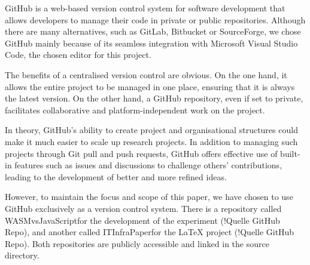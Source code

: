 GitHub is a web-based version control system for software development that allows developers to manage their code in private or public repositories. Although there are many alternatives, such as GitLab, Bitbucket or SourceForge, we chose GitHub mainly because of its seamless integration with Microsoft Visual Studio Code, the chosen editor for this project.

The benefits of a centralised version control are obvious. On the one hand, it allows the entire project to be managed in one place, ensuring that it is always the latest version. On the other hand, a GitHub repository, even if set to private, facilitates collaborative and platform-independent work on the project.

In theory, GitHub's ability to create project and organisational structures could make it much easier to scale up research projects. In addition to managing such projects through Git pull and push requests, GitHub offers effective use of built-in features such as issues and discussions to challenge others' contributions, leading to the development of better and more refined ideas.

However, to maintain the focus and scope of this paper, we have chosen to use GitHub exclusively as a version control system. There is a repository called \dq WASMvsJavaScript\dq  for the development of the experiment (!Quelle GitHub Repo), and another called \dq ITInfraPaper\dq  for the \LaTeX{} project (!Quelle GitHub Repo). Both repositories are publicly accessible and linked in the source directory.